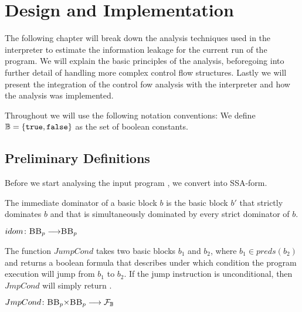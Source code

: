 \chapter{Design and Implementation}\label{sec:impl}

The following chapter will break down the analysis techniques used in the interpreter to estimate the information leakage for the current run of the program. We will explain the basic principles of the analysis, beforegoing into further detail of handling more complex control flow structures. Lastly we will present the integration of the control fow analysis with the interpreter and how the analysis was implemented.

Throughout we will use the following notation conventions:
We define $\mathbb{B} = \{ \mathtt{true}, \mathtt{false} \}$ as the set of boolean constants.


\section{Preliminary Definitions}

Before we start analysing the input program \p, we convert \p into SSA-form.


\begin{definition} The immediate dominator of a basic block $b$ is the basic block $b'$ that strictly dominates $b$ and that is simultaneously dominated by every strict dominator of $b$.
    \begin{center}
        $idom\colon \mbb_p \longrightarrow \mbb_p$
    \end{center}
\end{definition}

\begin{definition} The function $JumpCond$ takes two basic blocks $b_1$ and $b_2$, where $b_1 \in preds(b_2)$ and returns a boolean formula that describes under which condition the program execution will jump from $b_1$ to $b_2$. If the jump instruction is unconditional, then $JmpCond$ will simply return \ttt.
    \begin{center}
        $JmpCond\colon \mbb_p \times \mbb_p \longrightarrow \mbform$
    \end{center}
\end{definition}

